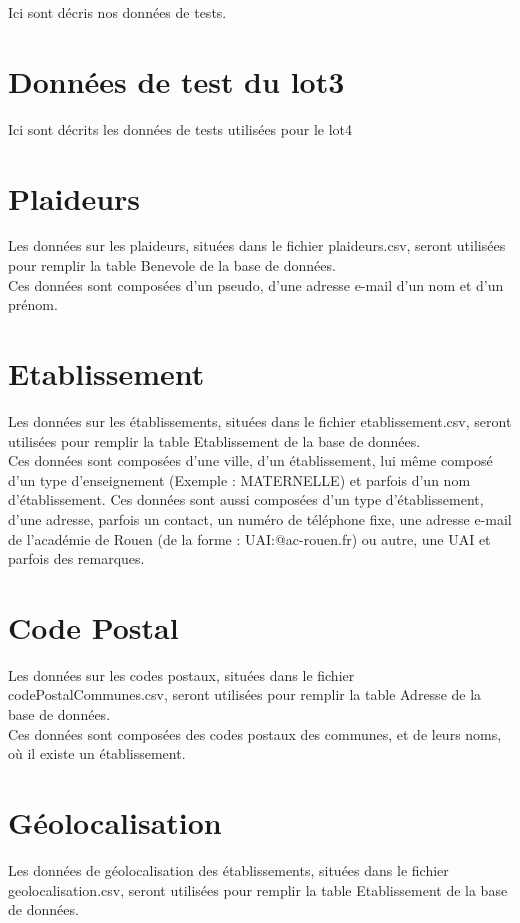 

Ici sont décris nos données de tests.

\section{Données de test du lot3}
	Ici sont décrits les données de tests utilisées pour le lot4

\section{Plaideurs}
	Les données sur les plaideurs, situées dans le fichier plaideurs.csv, seront utilisées pour remplir la table Benevole de la base de données. \\
	
	Ces données sont composées d'un pseudo, d'une adresse e-mail d'un nom et d'un prénom.	
\section{Etablissement}
	Les données sur les établissements, situées dans le fichier etablissement.csv, seront utilisées pour remplir la table Etablissement de la base de données. \\
	
	Ces données sont composées d'une ville, d'un établissement, lui même composé d'un type d'enseignement (Exemple : MATERNELLE) et parfois d'un nom d'établissement. Ces données sont aussi composées d'un type d'établissement, d'une adresse, parfois un contact, un numéro de téléphone fixe, une adresse e-mail de l'académie de Rouen (de la forme : UAI:@ac-rouen.fr) ou autre, une UAI et parfois des remarques.
	
\section{Code Postal}
	Les données sur les codes postaux, situées dans le fichier codePostalCommunes.csv, seront utilisées pour remplir la table Adresse de la base de données. \\
	
	Ces données sont composées des codes postaux des communes, et de leurs noms, où il existe un établissement.
	
\section{Géolocalisation}
	Les données de géolocalisation des établissements, situées dans le fichier geolocalisation.csv, seront utilisées pour remplir la table Etablissement de la base de données. \\
	
